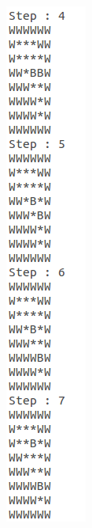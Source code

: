 \documentclass[10pt, letter]{article}
\begin{document}
\begin{figure} [h!]
\begin{subfigure}{.3\textwidth}
  \includegraphics[scale = 0.35]{images/sokoban2-ans2}
\end{subfigure}%
\begin{subfigure}{.3\textwidth}
  \centering

\end{subfigure}
\end{figure}
\end{document}
